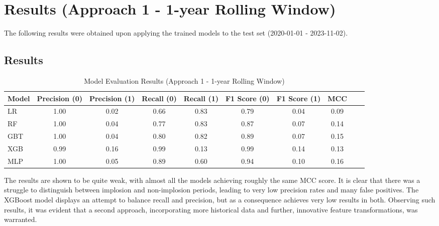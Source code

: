 \documentclass[a4paper]{report}
\begin{document}
\section{Results (Approach 1 - 1-year Rolling Window)}
The following results were obtained upon applying the trained models to the test set (2020-01-01 - 2023-11-02).

\subsection{Results}

\begin{table}[htbp]
  \centering
  \caption{Model Evaluation Results (Approach 1 - 1-year Rolling Window)}
  \begin{adjustbox}{max width=\textwidth}
  \begin{tabular}{l|ccccccccc|}
    \toprule
    Model & Precision (0) & Precision (1) & Recall (0) & Recall (1) & F1 Score (0) & F1 Score (1) & MCC \\
    \midrule
    LR & 1.00 & 0.02 & 0.66 & 0.83 & 0.79 & 0.04 & 0.09 \\
    RF & 1.00 & 0.04 & 0.77 & 0.83 & 0.87 & 0.07 & 0.14 \\
    GBT& 1.00 & 0.04 & 0.80 & 0.82 & 0.89 & 0.07 & 0.15 \\
    XGB& 0.99 & 0.16 & 0.99 & 0.13 & 0.99 & 0.14 & 0.13 \\
    MLP& 1.00 & 0.05 & 0.89 & 0.60 & 0.94 & 0.10 & 0.16 \\
    \bottomrule
  \end{tabular}
  \end{adjustbox}
\end{table}
The results are shown to be quite weak, with almost all the models achieving roughly the same MCC score. It is clear that there was a struggle 
to distinguish between implosion and non-implosion periods, leading to very low precision rates and many false positives. The XGBoost model 
displays an attempt to balance recall and precision, but as a consequence achieves very low results in both. Observing such results, it was 
evident that a second approach, incorporating more historical data and further, innovative feature transformations, was warranted. 
\end{document}
